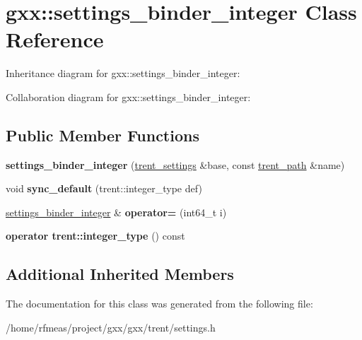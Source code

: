 \hypertarget{classgxx_1_1settings__binder__integer}{}\section{gxx\+:\+:settings\+\_\+binder\+\_\+integer Class Reference}
\label{classgxx_1_1settings__binder__integer}


Inheritance diagram for gxx\+:\+:settings\+\_\+binder\+\_\+integer\+:


Collaboration diagram for gxx\+:\+:settings\+\_\+binder\+\_\+integer\+:
\subsection*{Public Member Functions}
\begin{DoxyCompactItemize}
\item 
{\bfseries settings\+\_\+binder\+\_\+integer} (\hyperlink{structgxx_1_1trent__settings}{trent\+\_\+settings} \&base, const \hyperlink{structgxx_1_1trent__path}{trent\+\_\+path} \&name)\hypertarget{classgxx_1_1settings__binder__integer_a1997af1c5c2680869d7f647941b3b09a}{}\label{classgxx_1_1settings__binder__integer_a1997af1c5c2680869d7f647941b3b09a}

\item 
void {\bfseries sync\+\_\+default} (trent\+::integer\+\_\+type def)\hypertarget{classgxx_1_1settings__binder__integer_a6dbbba73c849fa8615d402fa9b8510f8}{}\label{classgxx_1_1settings__binder__integer_a6dbbba73c849fa8615d402fa9b8510f8}

\item 
\hyperlink{classgxx_1_1settings__binder__integer}{settings\+\_\+binder\+\_\+integer} \& {\bfseries operator=} (int64\+\_\+t i)\hypertarget{classgxx_1_1settings__binder__integer_a9afdf234199496e6ca721b222e421d95}{}\label{classgxx_1_1settings__binder__integer_a9afdf234199496e6ca721b222e421d95}

\item 
{\bfseries operator trent\+::integer\+\_\+type} () const \hypertarget{classgxx_1_1settings__binder__integer_ad85f2f8c1cdf8ee5123ffa99c697ad79}{}\label{classgxx_1_1settings__binder__integer_ad85f2f8c1cdf8ee5123ffa99c697ad79}

\end{DoxyCompactItemize}
\subsection*{Additional Inherited Members}


The documentation for this class was generated from the following file\+:\begin{DoxyCompactItemize}
\item 
/home/rfmeas/project/gxx/gxx/trent/settings.\+h\end{DoxyCompactItemize}
